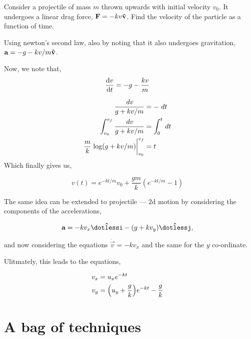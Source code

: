 \begin{example}
    Consider a projectile of mass \(m\) thrown upwards with initial velocity \(v_0\). It undergoes a linear drag 
    force, \(\Vec{F} =  -kv \unitv{v}\). Find the velocity of the particle as 
    a function of time. 
    \begin{soln}
        Using newton's second law, also by noting that 
        it also undergoes gravitation, \(\boldsymbol{\mathbf{a}} = -g -kv/m \boldsymbol{\mathbf{\hat{v}}}\).

        Now, we note that, 
        \begin{equation*}
            \dv{v}{t} = -g  - \frac{kv}{m}
        \end{equation*}

        \begin{align*}
            \frac{\dd{v}}{g + kv/m} &= - \dd{t} \\
            \int_{v_0}^{v_f} \frac{\dd{v}}{g + kv/m} &= \int_{0}^{t}\dd{t} \\
            \frac{m}{k} \eval{\log(g + kv/m)}_{v_0}^{v_f} &= t \\
        \end{align*}
        Which finally gives us,

        \begin{equation}
            v(t) = e^{-kt/m}v_0 + \frac{gm}{k}(e^{-kt/m} - 1)
        \end{equation}

    \end{soln}
\end{example}

The same idea can be extended to projectile --- \(2\)d motion 
by considering the components of the accelerations,

\[
    \vec{a} = -kv_x \ihat - (g + kv_y) \jhat,
\]

and now considering the equations \(\dot{\vec{v}} = -kv_x\)
and the same for the \(y\) co-ordinate. 

Ulitmately, this leads to the equations,

\begin{align}
    v_x &= u_x e^{-kt} \\
    v_y &= \qty(u_y + \frac{g}{k})e^{-kt} - \frac{g}{k}
\end{align}

\section{A bag of techniques}

